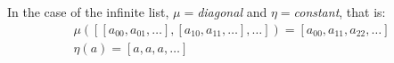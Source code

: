 In the case of the infinite list, $\mu=$\emph{diagonal} 
and $\eta=$\emph{constant}, that is:
\begin{gather*}
\mu([[a_{00},a_{01},\ldots],[a_{10},a_{11},\ldots],\ldots]) = 
[a_{00},a_{11},a_{22},\ldots] \\
\eta(a) = [a,a,a,\ldots]
\end{gather*}